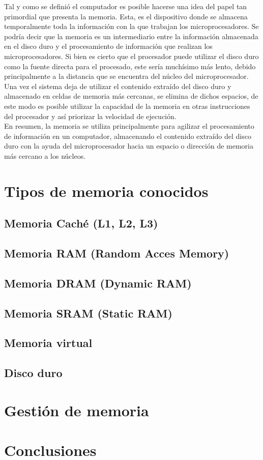 \documentclass{article}
\begin{document}
Tal y como se definió el computador es posible hacerse una idea del papel tan primordial que presenta la memoria. Esta, es el dispositivo donde se almacena temporalmente toda la información con la que trabajan los microprocesadores. Se podría decir que la memoria es un intermediario entre la información almacenada en el disco duro y el procesamiento de información que realizan los microprocesadores. Si bien es cierto que el procesador puede utilizar el disco duro como la fuente directa para el procesado, este sería muchísimo más lento, debido principalmente a la distancia que se encuentra del núcleo del microprocesador.
Una vez el sistema deja de utilizar el contenido extraído del disco duro y almacenado en celdas de memoria más cercanas, se elimina de dichos espacios, de este modo es posible utilizar la capacidad de la memoria en otras instrucciones del procesador y así priorizar la velocidad de ejecución.\\

En resumen, la memoria se utiliza principalmente para agilizar el procesamiento de información en un computador, almacenando el contenido extraído del disco duro con la ayuda del microprocesador hacia un espacio o dirección de memoria más cercano a los núcleos.


\section{Tipos de memoria conocidos} \label{contenido}


\subsection{Memoria Caché (L1, L2, L3)}
\subsection{Memoria RAM (Random Acces Memory)}
\subsection{Memoria DRAM (Dynamic RAM)}
\subsection{Memoria SRAM (Static RAM)}
\subsection{Memoria virtual}
\subsection{Disco duro}


\section{Gestión de memoria}

\section{Conclusiones}




\end{document}
